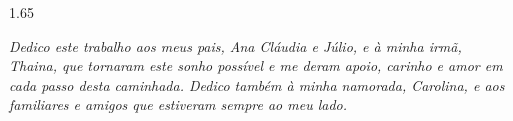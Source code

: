 \clearpage{\thispagestyle{empty}\origcleardoublepage}
\thispagestyle{empty}
\vspace*{10cm}

\begin{spacing}{1.65}
\begin{center}
\itshape
Dedico este trabalho aos meus pais, Ana Cláudia e Júlio, e à minha irmã, Thaina, que tornaram este sonho possível e me deram apoio, carinho e amor em cada passo desta caminhada. Dedico também à minha namorada, Carolina, e aos familiares e amigos que estiveram sempre ao meu lado.
\end{center}
\end{spacing}
